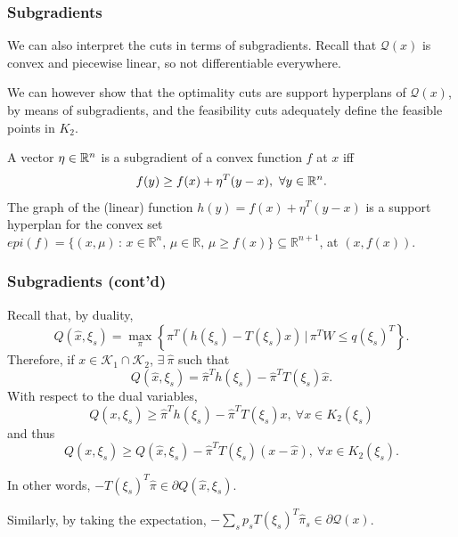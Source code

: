 \documentclass{beamer}
\def\cK{\mathcal{K}}
\begin{document}
\begin{frame}
\frametitle{Subgradients}

We can also interpret the cuts in terms of subgradients.
Recall that $\mathcal{Q}(x)$ is convex and piecewise linear, so not differentiable everywhere.
	
\mbox{}
	
We can however show that the optimality cuts are support hyperplans of $\mathcal{Q}(x)$, by means of subgradients, and the feasibility cuts adequately define the feasible points in $K_2$.

\mbox{}
	
A vector $\eta \in {\mathbb{R}}^n$ is a {\red subgradient} of a convex function $f$ at $x$ iff
\[ f(y) \geq f(x) + \eta^T(y-x),\ \forall y \in {\mathbb{R}}^n.\]
The graph of the (linear) function $h(y) = f(x) + \eta^T(y-x)$ is a support hyperplan for the convex set $epi(f) = \{ (x, \mu) \, : \, x \in \mathbb{R}^n,\, \mu \in \mathbb{R},\, \mu \ge f(x) \} \subseteq \mathbb{R}^{n+1}$, at $(x, f(x))$.
	
\end{frame}

\begin{frame}
\frametitle{Subgradients (cont'd)}

Recall that, by duality,
\[
Q(\hat{x}, \xi_s) =
\max_{\pi} \left\lbrace \pi^T(h(\xi_s)-T(\xi_s)x) \,|\, \pi^TW \leq q(\xi_s)^T \right\rbrace.
\]
Therefore, if $x \in \cK_1 \cap \cK_2$, $\exists\ \hat{\pi}$ such that
\[
Q(\hat{x}, \xi_s) = \hat{\pi}^Th(\xi_s)-\hat{\pi}^TT(\xi_s)\hat{x}.
\]
With respect to the dual variables,
\[
Q(x, \xi_s) \geq \hat{\pi}^Th(\xi_s)-\hat{\pi}^TT(\xi_s) x,
\ \forall x \in K_2(\xi_s)
\]
and thus
\[
Q(x, \xi_s) \geq Q({\hat{x}, \xi_s}) - \hat{\pi}^TT(\xi_s) (x-\hat{x}),
\ \forall x \in K_2(\xi_s).
\]
	
In other words, $-T(\xi_s)^T\hat{\pi} \in \partial Q(\hat{x}, \xi_s)$.
	
\mbox{}
	
Similarly, by taking the expectation, $- \sum_s p_s T(\xi_s)^T\hat{\pi}_s \in \partial \mathcal{Q}(x)$.
	
\end{frame}
\end{document}
